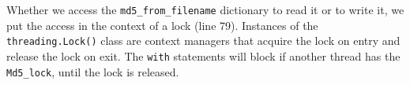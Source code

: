 Whether we access the \verb|md5_from_filename| dictionary to read it or to write it, we put the access in the context of a lock (line 79).
Instances of the \verb|threading.Lock()| class are context managers that acquire the lock on entry and release the lock on exit.
The \verb|with| statements will block if another thread has the \verb|Md5_lock|, until the lock is released.


